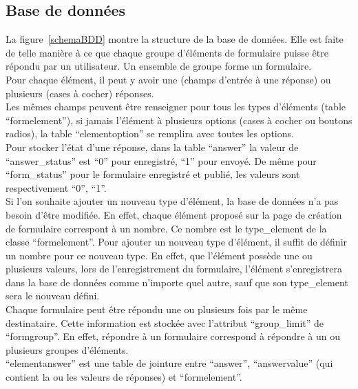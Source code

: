 \documentclass{sigplanconf}
\begin{document}
\subsection{Base de données}\label{sec:BDD}
La figure~\ref{schemaBDD} montre la structure de la base de données. Elle est faite de telle manière à ce que chaque groupe d'éléments de formulaire puisse être répondu par un utilisateur. Un ensemble de groupe forme un formulaire.\\
Pour chaque élément, il peut y avoir une (champs d'entrée à une réponse) ou plusieurs (cases à cocher) réponses.\\
Les mêmes champs peuvent être renseigner pour tous les types d'éléments (table ``formelement''), si jamais l'élément à plusieurs options (cases à cocher ou boutons radios), la table ``elementoption'' se remplira avec toutes les options.\\
Pour stocker l'état d'une réponse, dans la table ``answer'' la valeur de ``answer\_status'' est ``0'' pour enregistré, ``1'' pour envoyé. De même pour ``form\_status'' pour le formulaire enregistré et publié, les valeurs sont respectivement ``0'', ``1''.\\ 
Si l'on souhaite ajouter un nouveau type d'élément, la base de données n'a pas besoin d'être modifiée. En effet, chaque élément proposé sur la page de création de formulaire correspont à un nombre. Ce nombre est le type\_element de la classe ``formelement''. Pour ajouter un nouveau type d'élément, il suffit de définir un nombre pour ce nouveau type. En effet, que l'élément possède une ou plusieurs valeurs, lors de l'enregistrement du formulaire, l'élément s'enregistrera dans la base de données comme n'importe quel autre, sauf que son type\_element sera le nouveau défini.\\
Chaque formulaire peut être répondu une ou plusieurs fois par le même destinataire. Cette information est stockée avec l'attribut ``group\_limit'' de ``formgroup''. En effet, répondre à un formulaire correspond à répondre à un ou plusieurs groupes d'éléments.\\
``elementanswer'' est une table de jointure entre ``answer'', ``answervalue'' (qui contient la ou les valeurs de réponses) et ``formelement''.
\end{document}
